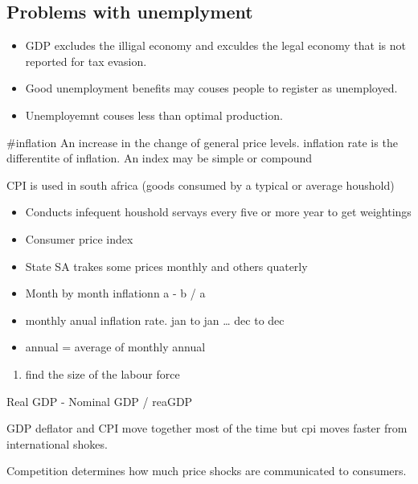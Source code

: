 \documentclass[]{article}
\providecommand{\tightlist}{%
  \setlength{\itemsep}{0pt}\setlength{\parskip}{0pt}}
\begin{document}
\hypertarget{problems-with-unemplyment}{%
\subsection{Problems with unemplyment}\label{problems-with-unemplyment}}

\begin{itemize}
\tightlist
\item
  GDP excludes the illigal economy and exculdes the legal economy that
  is not reported for tax evasion.
\item
  Good unemployment benefits may couses people to register as
  unemployed.
\item
  Unemployemnt couses less than optimal production.
\end{itemize}

\#inflation An increase in the change of general price levels. inflation
rate is the differentite of inflation. An index may be simple or
compound

CPI is used in south africa (goods consumed by a typical or average
houshold)

\begin{itemize}
\tightlist
\item
  Conducts infequent houshold servays every five or more year to get
  weightings
\item
  Consumer price index
\item
  State SA trakes some prices monthly and others quaterly
\item
  Month by month inflationn a - b / a
\item
  monthly anual inflation rate. jan to jan \ldots{} dec to dec
\item
  annual = average of monthly annual
\end{itemize}

\begin{enumerate}
\tightlist
\item
  find the size of the labour force
\end{enumerate}

\begin{description}
\tightlist
\item[GDP deflator]
Real GDP - Nominal GDP / reaGDP
\end{description}

GDP deflator and CPI move together most of the time but cpi moves faster
from international shokes.

Competition determines how much price shocks are communicated to
consumers.
\end{document}
